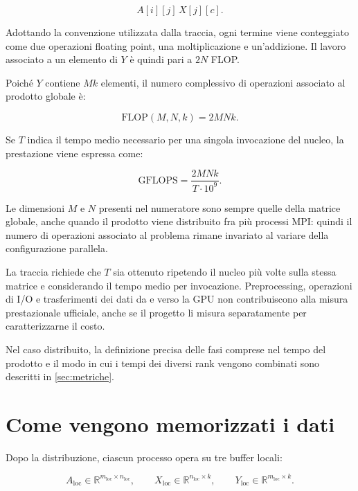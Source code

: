 \[
A[i][j]\,X[j][c].
\]

Adottando la convenzione utilizzata dalla traccia, ogni termine viene
conteggiato come due operazioni floating point, una moltiplicazione e
un'addizione. Il lavoro associato a un elemento di $Y$ è quindi pari a $2N$ FLOP.

Poiché $Y$ contiene $M k$ elementi, il numero complessivo di operazioni
associato al prodotto globale è:

\begin{equation}
    \mathrm{FLOP}(M,N,k)
    =
    2MNk.
    \label{eq:flops-totali}
\end{equation}

Se $T$ indica il tempo medio necessario per una singola invocazione del
nucleo, la prestazione viene espressa come:

\begin{equation}
    \mathrm{GFLOPS}
    =
    \frac{2MNk}{T\cdot10^9}.
    \label{eq:gflops}
\end{equation}

Le dimensioni $M$ e $N$ presenti nel numeratore sono sempre quelle della
matrice globale, anche quando il prodotto viene distribuito fra più
processi MPI: quindi il numero di operazioni associato al problema rimane
invariato al variare della configurazione parallela.

La traccia richiede che $T$ sia ottenuto ripetendo il nucleo più volte
sulla stessa matrice e considerando il tempo medio per invocazione.
Preprocessing, operazioni di I/O e trasferimenti dei dati da e verso la
GPU non contribuiscono alla misura prestazionale ufficiale, anche se il
progetto li misura separatamente per caratterizzarne il costo.

Nel caso distribuito, la definizione precisa delle fasi comprese nel tempo
del prodotto e il modo in cui i tempi dei diversi rank vengono combinati
sono descritti in \cref{sec:metriche}.

\section{Come vengono memorizzati i dati}
\label{sec:layout}

Dopo la distribuzione, ciascun processo opera su tre buffer locali:

\[
A_{\mathrm{loc}}
\in \mathbb{R}^{m_{\mathrm{loc}}\times n_{\mathrm{loc}}},
\qquad
X_{\mathrm{loc}}
\in \mathbb{R}^{n_{\mathrm{loc}}\times k},
\qquad
Y_{\mathrm{loc}}
\in \mathbb{R}^{m_{\mathrm{loc}}\times k}.
\]

